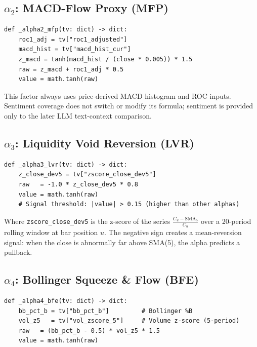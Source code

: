 \subsection{$\alpha_2$: MACD-Flow Proxy (MFP)}

\begin{small}
\begin{verbatim}
def _alpha2_mfp(tv: dict) -> dict:
    roc1_adj = tv["roc1_adjusted"]
    macd_hist = tv["macd_hist_cur"]
    z_macd = tanh(macd_hist / (close * 0.005)) * 1.5
    raw = z_macd + roc1_adj * 0.5
    value = math.tanh(raw)
\end{verbatim}
\end{small}

This factor always uses price-derived MACD histogram and ROC inputs. Sentiment coverage does not switch or modify its formula; sentiment is provided only to the later LLM text-context comparison.

\subsection{$\alpha_3$: Liquidity Void Reversion (LVR)}

\begin{small}
\begin{verbatim}
def _alpha3_lvr(tv: dict) -> dict:
    z_close_dev5 = tv["zscore_close_dev5"]
    raw   = -1.0 * z_close_dev5 * 0.8
    value = math.tanh(raw)
    # Signal threshold: |value| > 0.15 (higher than other alphas)
\end{verbatim}
\end{small}

Where \texttt{zscore\_close\_dev5} is the z-score of the series $\frac{C_u - \mathrm{SMA}_5}{C_u}$ over a 20-period rolling window at bar position $u$. The negative sign creates a mean-reversion signal: when the close is abnormally far above SMA(5), the alpha predicts a pullback.

\subsection{$\alpha_4$: Bollinger Squeeze \& Flow (BFE)}

\begin{small}
\begin{verbatim}
def _alpha4_bfe(tv: dict) -> dict:
    bb_pct_b = tv["bb_pct_b"]         # Bollinger %B
    vol_z5   = tv["vol_zscore_5"]     # Volume z-score (5-period)
    raw   = (bb_pct_b - 0.5) * vol_z5 * 1.5
    value = math.tanh(raw)
\end{verbatim}
\end{small}

